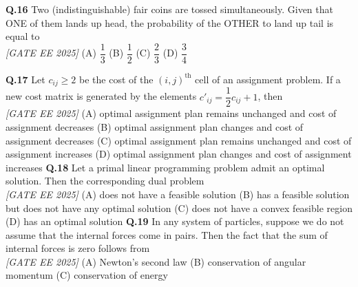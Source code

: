 \documentclass[11pt]{article}
\begin{document}
\textbf{Q.16} Two (indistinguishable) fair coins are tossed simultaneously. Given that ONE of them lands up head, the probability of the OTHER to land up tail is equal to
\\[1ex] \textit{[GATE EE 2025]}
\newline
(A) $\dfrac{1}{3}$ \hspace{10mm}
(B) $\dfrac{1}{2}$ \hspace{10mm}
(C) $\dfrac{2}{3}$ \hspace{10mm}
(D) $\dfrac{3}{4}$ \newline

\textbf{Q.17} Let $c_{ij} \geq 2$ be the cost of the $(i,j)^{\text{th}}$ cell of an assignment problem. If a new cost matrix is generated by the elements $c'_{ij} = \dfrac{1}{2} c_{ij} + 1$, then
\\[1ex] \textit{[GATE EE 2025]}
\newline
(A) optimal assignment plan remains unchanged and cost of assignment decreases \newline
(B) optimal assignment plan changes and cost of assignment decreases \newline
(C) optimal assignment plan remains unchanged and cost of assignment increases \newline
(D) optimal assignment plan changes and cost of assignment increases
\newline
\newline
\textbf{Q.18} Let a primal linear programming problem admit an optimal solution. Then the corresponding dual problem 
\\[1ex] \textit{[GATE EE 2025]}
\newline
(A) does not have a feasible solution \newline
(B) has a feasible solution but does not have any optimal solution \newline
(C) does not have a convex feasible region \newline
(D) has an optimal solution
\newline
\newline
\textbf{Q.19} In any system of particles, suppose we do not assume that the internal forces come in pairs. Then the fact that the sum of internal forces is zero follows from
\\[1ex] \textit{[GATE EE 2025]}
\newline
(A) Newton's second law \newline
(B) conservation of angular momentum \newline
(C) conservation of energy \newline
\end{document}
